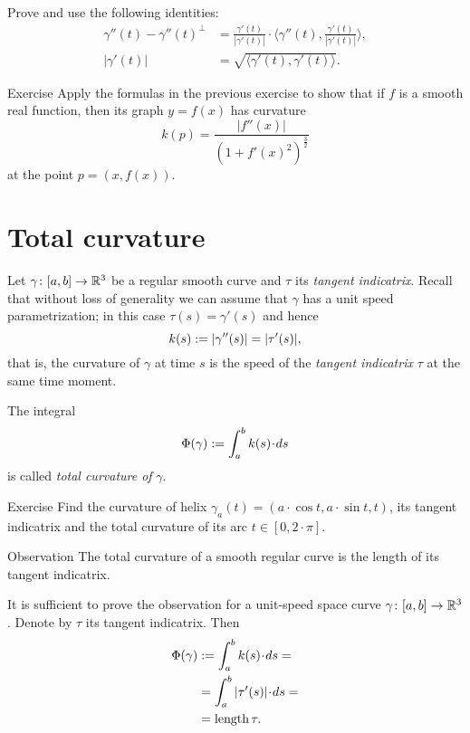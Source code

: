  Prove and use the following identities: 
\begin{align*}
\gamma''(t)-\gamma''(t)^\perp&=\tfrac{\gamma'(t)}{|\gamma'(t)|}\cdot\langle\gamma''(t),\tfrac{\gamma'(t)}{|\gamma'(t)|}\rangle,
\\
|\gamma'(t)|&=\sqrt{\langle \gamma'(t),\gamma'(t)\rangle}.\
\end{align*}


\begin{thm}{Exercise}\label{ex:curvature-graph}
Apply the formulas in the previous exercise to show that if $f$ is a smooth real function,
then its graph $y=f(x)$  has curvature
\[k(p)=\frac{|f''(x)|}{(1+f'(x)^2)^{\frac32}}\]
at the point $p=(x,f(x))$.
\end{thm}

\section*{Total curvature}

Let $\gamma\colon[a,b]\to\mathbb{R}^3$ be a regular smooth curve and $\tau$ its \emph{tangent indicatrix}.
Recall that without loss of generality we can assume that $\gamma$ has a unit speed parametrization;
in this case $\tau(s)=\gamma'(s)$ and hence
\[k(s):=|\gamma''(s)|=|\tau'(s)|,\] 
that is, the curvature of $\gamma$ at time $s$ is the speed of the \emph{tangent indicatrix} $\tau$ at the same time moment.

The integral 
\[\tc\gamma:=\int_a^bk(s)\cdot ds\]
is called \emph{total curvature of} $\gamma$.

\begin{thm}{Exercise}\label{ex:helix-curvature}
Find the curvature of helix $\gamma_a(t)=(a\cdot \cos t,a\cdot \sin t,t)$, its tangent indicatrix and the total curvature of its arc $t\in[0,2\cdot\pi]$.
\end{thm}

\begin{thm}{Observation}\label{obs:tantrix}
The total curvature of a smooth regular curve is the length of its tangent indicatrix.
\end{thm}

It is sufficient to prove the observation for a unit-speed space curve $\gamma\colon[a,b]\to\mathbb{R}^3$.
Denote by $\tau$ its tangent indicatrix.
Then
\begin{align*}
\tc\gamma&\df\int_a^bk(s)\cdot ds=
\\
&=\int_a^b|\tau'(s)|\cdot ds=
\\
&=\length\tau.
\end{align*}
\qedsf %

